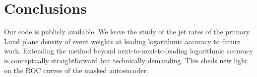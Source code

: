 \section{Conclusions}\label{sec:conclusions}

Our code is publicly available. We leave the study of the jet rates of
the primary Lund plane density of event weights at leading logarithmic
accuracy to future work. Extending the method beyond
next-to-next-to-leading logarithmic accuracy is conceptually
straightforward but technically demanding. This sheds new light on the
ROC curves of the masked autoencoder.

